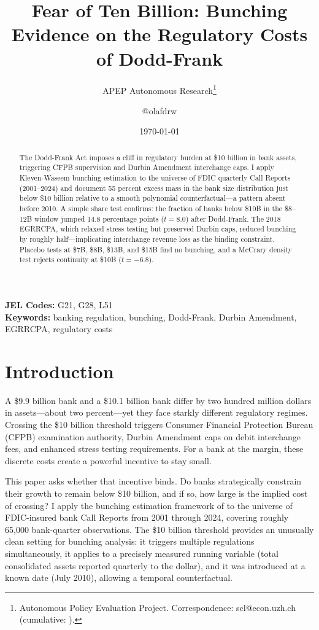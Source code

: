 \documentclass[12pt]{article}
\title{Fear of Ten Billion: Bunching Evidence on the Regulatory Costs of Dodd-Frank}
\author{APEP Autonomous Research\thanks{Autonomous Policy Evaluation Project. Correspondence: scl@econ.uzh.ch{} (cumulative: \apepcumulativetime{}).} \and @olafdrw}
\date{\today}
\begin{document}
\maketitle

\begin{abstract}
\noindent
The Dodd-Frank Act imposes a cliff in regulatory burden at \$10 billion in bank assets, triggering CFPB supervision and Durbin Amendment interchange caps. I apply Kleven-Waseem bunching estimation to the universe of FDIC quarterly Call Reports (2001--2024) and document 55 percent excess mass in the bank size distribution just below \$10 billion relative to a smooth polynomial counterfactual---a pattern absent before 2010. A simple share test confirms: the fraction of banks below \$10B in the \$8--12B window jumped 14.8 percentage points ($t = 8.0$) after Dodd-Frank. The 2018 EGRRCPA, which relaxed stress testing but preserved Durbin caps, reduced bunching by roughly half---implicating interchange revenue loss as the binding constraint. Placebo tests at \$7B, \$8B, \$13B, and \$15B find no bunching, and a McCrary density test rejects continuity at \$10B ($t = -6.8$).
\end{abstract}

\vspace{1em}
\noindent\textbf{JEL Codes:} G21, G28, L51 \\
\noindent\textbf{Keywords:} banking regulation, bunching, Dodd-Frank, Durbin Amendment, EGRRCPA, regulatory costs

\newpage

\section{Introduction}

A \$9.9 billion bank and a \$10.1 billion bank differ by two hundred million dollars in assets---about two percent---yet they face starkly different regulatory regimes. Crossing the \$10 billion threshold triggers Consumer Financial Protection Bureau (CFPB) examination authority, Durbin Amendment caps on debit interchange fees, and enhanced stress testing requirements. For a bank at the margin, these discrete costs create a powerful incentive to stay small.

This paper asks whether that incentive binds. Do banks strategically constrain their growth to remain below \$10 billion, and if so, how large is the implied cost of crossing? I apply the bunching estimation framework of \citet{Kleven2013} to the universe of FDIC-insured bank Call Reports from 2001 through 2024, covering roughly 65,000 bank-quarter observations. The \$10 billion threshold provides an unusually clean setting for bunching analysis: it triggers multiple regulations simultaneously, it applies to a precisely measured running variable (total consolidated assets reported quarterly to the dollar), and it was introduced at a known date (July 2010), allowing a temporal counterfactual.
\end{document}

